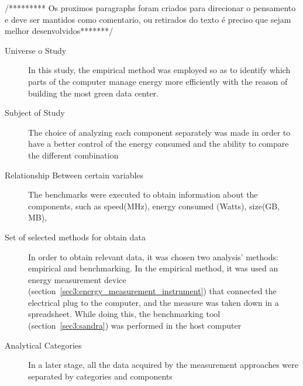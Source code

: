     /********* Os proximos paragraphs foram criados para direcionar o pensamento e deve ser mantidos como comentario, ou retirados do texto é preciso que sejam melhor desenvolvidos*******/
    \begin{description}
    \item[Universe o Study] 
    In this study, the empirical method was employed so as to identify which parts of the computer manage energy more efficiently with the reason of building the most green data center. 
    
    \item[Subject of Study]
    The choice of analyzing each component separately was made in order to have a better control of the energy consumed and the ability to compare the different combination 
    
    \item[Relationship Between certain variables]
    The benchmarks were executed to obtain information about the components, such as speed(MHz), energy consumed (Watts), size(GB, MB), 
    
    \item[Set of selected methods for obtain data] 
    In order to obtain relevant data, it was chosen two analysis' methods: empirical and benchmarking. In the empirical method, it was used an energy measurement device (section~\ref{sec3:energy_measurement_instrument}) that connected the electrical plug to the computer, and the measure was taken down in a spreadsheet. While doing this, the benchmarking tool (section~\ref{sec3:sandra}) was performed in the host computer
    
    
    \item[Analytical Categories]
    In a later stage, all the data acquired by the measurement approaches were separated by categories and components
    
    \end{description}
    
